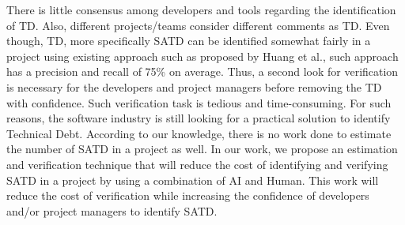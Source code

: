 There is little consensus among developers and tools regarding the identification of TD. Also, different projects/teams consider different comments as TD\cite{zazworka2013case}\cite{kruchten2013technical}\cite{ernst2015measure}. Even though, TD, more specifically SATD can be identified somewhat fairly in a project using existing approach such as proposed by Huang et al.\cite{huang2018identifying}, such approach has a precision and recall of 75\% on average. Thus, a second look for verification is necessary for the developers and project managers before removing the TD with confidence. Such verification task is tedious and time-consuming. For such reasons, the software industry is still looking for a practical solution to identify Technical Debt\cite{yli2016software}. According to our knowledge, there is no work done to estimate the number of SATD in a project as well. In our work, we propose an estimation and verification technique that will reduce the cost of identifying and verifying SATD in a project by using a combination of AI and Human. This work will reduce the cost of verification while increasing the confidence of developers and/or project managers to identify SATD.